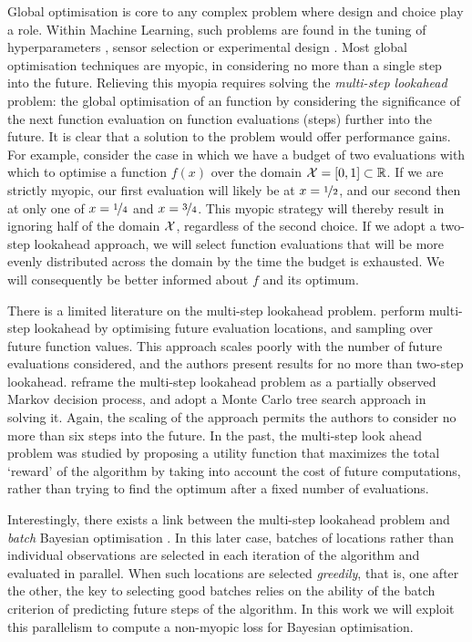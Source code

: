 \documentclass[twoside]{article}
\newcommand{\reals}{\mathbb{R}}
\begin{document}
Global optimisation is core to any complex problem where design and choice play a role. 
Within Machine Learning, such problems are found in the tuning of hyperparameters \citep{Snoek*Larochelle*Adams_2012}, sensor selection \citep{Garnett*Osborne*Roberts_2010} or experimental design \citep{gonzalez2014, martinez-cantin_bayesian_2009}. 
Most global optimisation techniques are myopic, in considering no more than a single step into the future. 
Relieving this myopia requires solving the \emph{multi-step lookahead} problem: the global optimisation of an function by considering the significance of the next function evaluation on function evaluations (steps) further into the future. 
It is clear that a solution to the problem would offer performance gains.
For example, consider the case in which we have a budget of two evaluations with which to optimise a function $f(x)$ over the domain $\inputSpace = [0, 1] \subset \reals$. 
If we are strictly myopic, our first evaluation will likely be at 
$x=\nicefrac{1}{2}$, and our second then at only one of $x=\nicefrac{1}{4}$ and $x=\nicefrac{3}{4}$. 
This myopic strategy will thereby result in ignoring half of the domain $\mathcal{X}$, regardless of the second choice. 
If we adopt a two-step lookahead approach, we will select function evaluations that will be more evenly distributed across the domain by the time the budget is exhausted. 
We will consequently be better informed about $f$ and its optimum.

There is a limited literature on the multi-step lookahead problem.
\cite{osborne_gaussian_2009} perform multi-step lookahead by optimising future evaluation locations, and sampling over future function values. 
This approach scales poorly with the number of future evaluations considered, and the authors present results for no more than two-step lookahead.
\citep{Marchant*Ramos*Sanner*2014} reframe the multi-step lookahead problem as a partially observed Markov decision process, and adopt a Monte Carlo tree search approach in solving it. 
Again, the scaling of the approach permits the authors to consider no more than six steps into the future. In the past, the multi-step look ahead problem was studied by \cite{StreltsovVakili1999} proposing a utility function that maximizes the total `reward' of the algorithm by taking into account the cost of future computations, rather than trying to find the optimum after a fixed number of evaluations.

Interestingly, there exists a link between the multi-step lookahead problem and \emph{batch} Bayesian optimisation \citep{Ginsbourger2009,Azimi2012}. In this later case, batches of locations rather than individual observations are selected in each iteration of the algorithm and evaluated in parallel. When such locations are selected \emph{greedily}, that is, one after the other, the key to selecting good batches relies on the ability of the batch criterion of predicting future steps of the algorithm. In this work we will exploit this parallelism to compute a non-myopic loss for Bayesian optimisation. 
\end{document}
